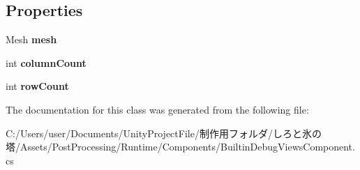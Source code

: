 \subsection*{Properties}
\begin{DoxyCompactItemize}
\item 
\mbox{\label{class_unity_engine_1_1_post_processing_1_1_builtin_debug_views_component_1_1_arrow_array_ae33f87b188a3c31389d8d0fed7976b72}} 
Mesh {\bfseries mesh}
\item 
\mbox{\label{class_unity_engine_1_1_post_processing_1_1_builtin_debug_views_component_1_1_arrow_array_acbad6b917b6d6323a6eb1e3f3e15c72c}} 
int {\bfseries column\+Count}
\item 
\mbox{\label{class_unity_engine_1_1_post_processing_1_1_builtin_debug_views_component_1_1_arrow_array_af1f6b86d07bf6df1c492cba29c9635cb}} 
int {\bfseries row\+Count}
\end{DoxyCompactItemize}


The documentation for this class was generated from the following file\+:\begin{DoxyCompactItemize}
\item 
C\+:/\+Users/user/\+Documents/\+Unity\+Project\+File/制作用フォルダ/しろと氷の塔/\+Assets/\+Post\+Processing/\+Runtime/\+Components/Builtin\+Debug\+Views\+Component.\+cs\end{DoxyCompactItemize}
